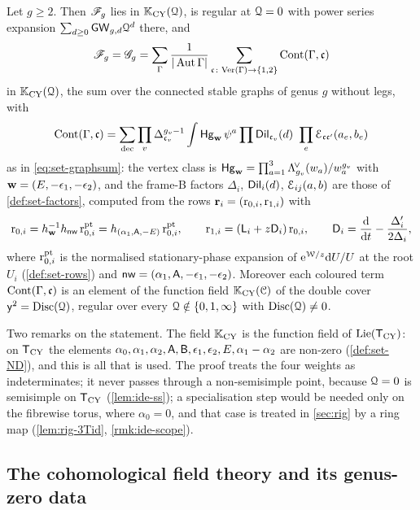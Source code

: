 \begin{prop}
\label{prop:ide-main}
Let $g\geq 2$. Then $\mathscr{F}_g$ lies in $\mathbb{K}_{\mathrm{CY}}(\mathcal{Q})$, is regular at $\mathcal{Q}=0$ with power series expansion $\sum_{d\geq 0}\mathsf{GW}_{g,d}\mathcal{Q}^d$ there, and
\begin{equation}
\label{eq:ide-main}
\mathscr{F}_g=\mathscr{G}_g=\sum_{\Gamma}\frac{1}{|\operatorname{Aut}\Gamma|}\sum_{\mathfrak{c}\colon\mathrm{Ver}(\Gamma)\to\{1,2\}}\mathrm{Cont}(\Gamma,\mathfrak{c})
\end{equation}
in $\mathbb{K}_{\mathrm{CY}}(\mathcal{Q})$, the sum over the connected stable graphs of genus $g$ without legs, with
\[
\GCont(\Gamma,\col)=\sum_{\mathrm{dec}}\prod_v\Delta_{\col_v}^{g_v-1}\int\Hg_{\bw}\,\psi^{a}\prod\Dil_{\col_v}(d)\ \prod_e\Edge_{\col\col'}(a_e,b_e)
\]
as in \cref{eq:set-graphsum}: the vertex class is $\mathsf{Hg}_{\mathbf{w}}=\prod_{a=1}^3\Lambda^{\!\vee}_{g_v}(w_a)/w_a^{g_v}$ with $\mathbf{w}=(E,-\epsilon_1,-\epsilon_2)$, and the frame-B factors $\Delta_i$, $\mathsf{Dil}_i(d)$, $\mathcal{E}_{ij}(a,b)$ are those of \cref{def:set-factors}, computed from the rows $\mathbf{r}_i=(\mathrm{r}_{0,i},\mathrm{r}_{1,i})$ with
\[
\mathrm{r}_{0,i}=h_{\mathbf{w}}^{-1}h_{\mathsf{nw}}\,\mathrm{r}^{\mathrm{pt}}_{0,i}=h_{(\alpha_1,\mathsf{A},-E)}\,\mathrm{r}^{\mathrm{pt}}_{0,i},\qquad \mathrm{r}_{1,i}=(\mathsf{L}_i+z\mathsf{D}_i)\,\mathrm{r}_{0,i},\qquad \mathsf{D}_i=\frac{\mathrm{d}}{\mathrm{d} t}-\frac{\Delta_i'}{2\Delta_i},
\]
where $\mathrm{r}^{\mathrm{pt}}_{0,i}$ is the normalised stationary-phase expansion of $\mathrm{e}^{\mathcal{W}/z}\mathrm{d} U/U$ at the root $U_i$ (\cref{def:set-rows}) and $\mathsf{nw}=(\alpha_1,\mathsf{A},-\epsilon_1,-\epsilon_2)$. Moreover each coloured term $\mathrm{Cont}(\Gamma,\mathfrak{c})$ is an element of the function field $\mathbb{K}_{\mathrm{CY}}(\mathcal{C})$ of the double cover $\mathsf{y}^2=\operatorname{Disc}(\mathcal{Q})$, regular over every $\mathcal{Q}\notin\{0,1,\infty\}$ with $\operatorname{Disc}(\mathcal{Q})\neq 0$.
\end{prop}

Two remarks on the statement. The field $\mathbb{K}_{\mathrm{CY}}$ is the function field of $\mathrm{Lie}(\mathsf{T}_{\mathrm{CY}})$: on $\mathsf{T}_{\mathrm{CY}}$ the elements $\alpha_0,\alpha_1,\alpha_2,\mathsf{A},\mathsf{B},\epsilon_1,\epsilon_2,E,\alpha_1-\alpha_2$ are non-zero (\cref{def:set-ND}), and this is all that is used. The proof treats the four weights as indeterminates; it never passes through a non-semisimple point, because $\mathcal{Q}=0$ is semisimple on $\mathsf{T}_{\mathrm{CY}}$ (\cref{lem:ide-ss}); a specialisation step would be needed only on the fibrewise torus, where $\alpha_0=0$, and that case is treated in \cref{sec:rig} by a ring map (\cref{lem:rig-3Tid}, \cref{rmk:ide-scope}).

\subsection{The cohomological field theory and its genus-zero data}

